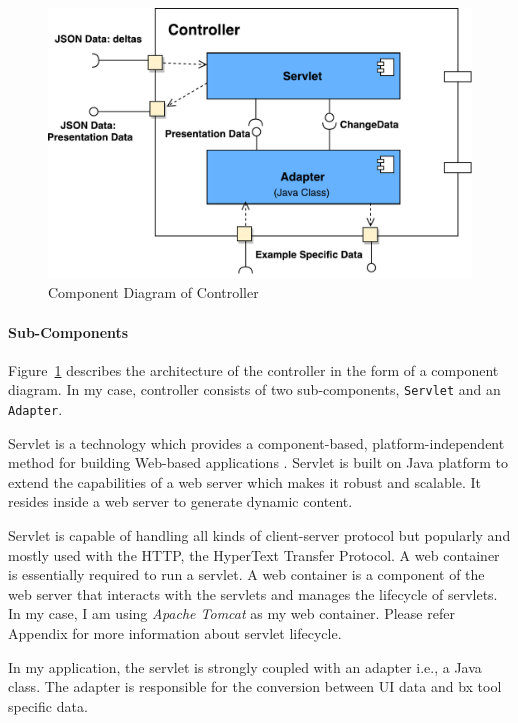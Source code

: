 \begin{figure}[h]
	\includegraphics[width=1\textwidth]{figures/Component_Diagram-Controller}
	\caption{Component Diagram of Controller}
	\label{fig:Component_Diagram-Controller}
\end{figure}

\paragraph{Sub-Components}
Figure~\ref{fig:Component_Diagram-Controller} describes the architecture of the controller in the form of a component diagram. In my case, controller consists of two sub-components, \texttt{Servlet} and an \texttt{Adapter}.

Servlet is a technology which provides a component-based, platform-independent method for building Web-based applications \cite{servlet}. Servlet is built on Java platform to extend the capabilities of a web server which makes it robust and scalable. It resides inside a web server to generate dynamic content.

Servlet is capable of handling all kinds of client-server protocol but popularly and mostly used with the HTTP, the HyperText Transfer Protocol. A web container is essentially required to run a servlet. A web container is a component of the web server that interacts with the servlets and manages the lifecycle of servlets. In my case, I am using \textit{Apache Tomcat} as my web container. Please refer Appendix for more information about servlet lifecycle.

In my application, the servlet is strongly coupled with an adapter i.e., a Java class. The adapter is responsible for the conversion between UI data and bx tool specific data.

